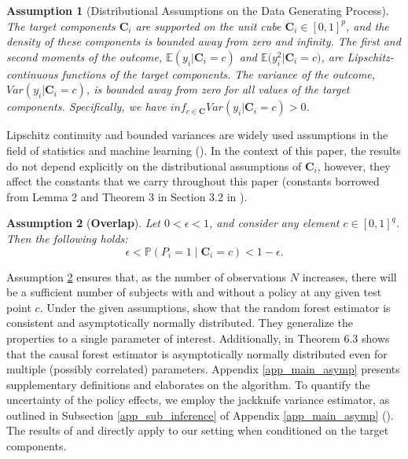 \documentclass[12pt]{article}
\newtheorem{assump}{Assumption}[section]
\begin{document}
\begin{assump}[Distributional Assumptions on the Data Generating Process]\label{ass_dgp}
The target components $\mathbf{C}_i$ are supported on the unit cube $\mathbf{C}_i\in [0, 1]^p$, and the density of these components is bounded away from zero and infinity. The first and second moments of the outcome, $\mathbb{E}(y_{i}|\mathbf{C}_i = c)$ and $\mathbb{E}\big(y_{i}^2|\mathbf{C}_i = c\big)$, are Lipschitz-continuous functions of the target components.
The variance of the outcome, $Var(y_{i}|\mathbf{C}_i = c)$, is bounded away from zero for all values of the target components. Specifically, we have $inf_{c \in \mathbf{C}} Var(y_{i}|\mathbf{C}_i = c) > 0$. 
\end{assump}

Lipschitz continuity and bounded variances are widely used assumptions in the field of statistics and machine learning (\citealp{wager2018estimation, biau2012analysis}). In the context of this paper, the results do not depend explicitly on the distributional assumptions of $\mathbf{C}_i$, however, they affect the constants that we carry throughout this paper (constants borrowed from Lemma 2 and Theorem 3 in Section 3.2 in \citealp{wager2018estimation}).  

\begin{assump}[\textbf{Overlap}]\label{ass_overlap}
Let $0 < \epsilon < 1$, and consider any element $c \in [0, 1]^q$. Then the following holds:
$$
\epsilon < \mathbb{P}(P_i = 1 \mid \mathbf{C}_i = c) < 1 - \epsilon.
$$
\end{assump}

Assumption \ref{ass_overlap} ensures that, as the number of observations $N$ increases, there will be a sufficient number of subjects with and without a policy at any given test point $c$. 
Under the given assumptions, \cite{wager2018estimation} show that the random forest estimator is consistent and asymptotically normally distributed. They generalize the properties to a single parameter of interest. Additionally, \cite{nareklishvili2022adaptive} in Theorem 6.3 shows that the causal forest estimator is asymptotically normally distributed even for multiple (possibly correlated) parameters. Appendix \ref{app_main_asymp} presents supplementary definitions and elaborates on the algorithm. To quantify the uncertainty of the policy effects, we employ the jackknife variance estimator, as outlined in Subsection \ref{app_sub_inference} of Appendix \ref{app_main_asymp} (\citealp{wager2018estimation}). The  results of \cite{wager2018estimation} and \cite{nareklishvili2022adaptive} directly apply to our setting when conditioned on the target components. 
\end{document}
